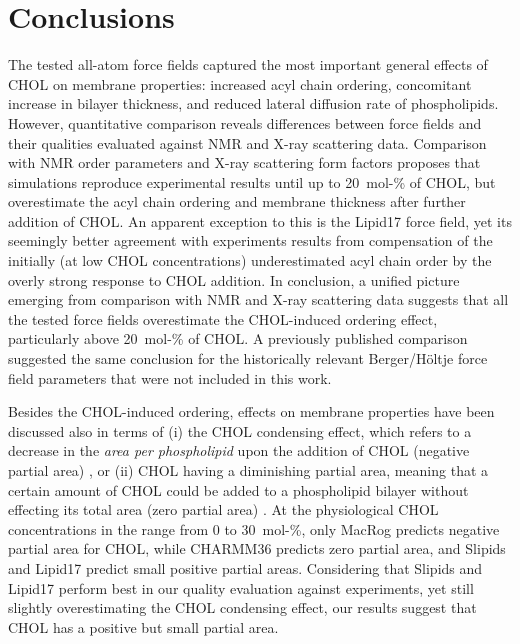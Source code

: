 \documentclass[journal=jctcce]{achemso}
\begin{document}
\section{Conclusions}

The tested all-atom force fields captured the most important general effects of CHOL on membrane properties: increased acyl chain ordering, concomitant increase in bilayer thickness, and reduced lateral diffusion rate of phospholipids. However, quantitative comparison reveals differences between force fields and their qualities evaluated against NMR and X-ray scattering data. Comparison with NMR order parameters and X-ray scattering form factors proposes that simulations reproduce experimental results until up to 20~mol-\% of CHOL, but overestimate the acyl chain ordering and membrane thickness after further addition of CHOL. An apparent exception to this is the Lipid17 force field, yet its seemingly better agreement with experiments results from compensation of the initially (at low CHOL concentrations) underestimated acyl chain order by the overly strong response to CHOL addition. In conclusion, a unified picture emerging from comparison with NMR and X-ray scattering data suggests that all the tested force fields overestimate the CHOL-induced ordering effect, particularly above 20~mol-\% of CHOL. A previously published comparison~\cite{ferreira13} suggested the same conclusion for the historically relevant Berger/H{\"o}ltje force field parameters \cite{Berger97,Holtje01} that were not included in this work.

Besides the CHOL-induced ordering, effects on membrane properties have been discussed also in terms of (i) the CHOL condensing effect, which refers to a decrease in the \emph{area per phospholipid} upon the addition of CHOL (negative partial area) \cite{edholm2005areas}, or (ii) CHOL having a diminishing partial area, meaning that a certain amount of CHOL could be added to a phospholipid bilayer without effecting its total area (zero partial area) \cite{javanainen2017two}. At the physiological CHOL concentrations in the range from 0 to 30~mol-\%, only MacRog predicts negative partial area for CHOL, while CHARMM36 predicts zero partial area, and Slipids and Lipid17 predict small positive partial areas. Considering that Slipids and Lipid17 perform best in our quality evaluation against experiments, yet still slightly overestimating the CHOL condensing effect, our results suggest that CHOL has a positive but small partial area.
\end{document}
